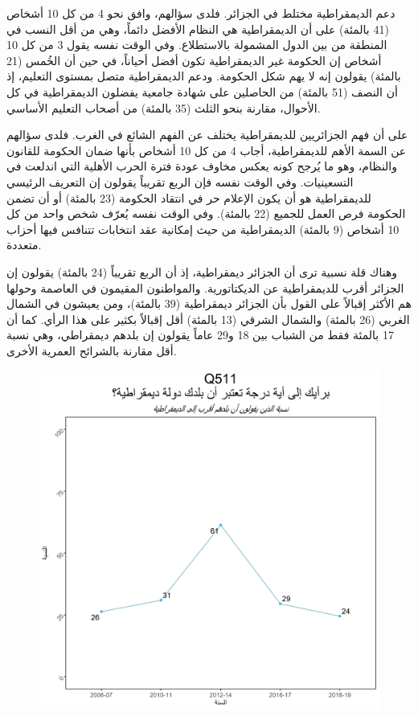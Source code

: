 \documentclass{article}
\begin{document}
 دعم الديمقراطية مختلط في الجزائر. فلدى سؤالهم، وافق نحو 4 من كل 10 أشخاص (41 بالمئة) على أن الديمقراطية هي النظام الأفضل دائماً، وهي من أقل النسب في المنطقة من بين الدول المشمولة بالاستطلاع. وفي الوقت نفسه يقول 3 من كل 10 أشخاص إن الحكومة غير الديمقراطية تكون أفضل أحياناً، في حين أن الخُمس (21 بالمئة) يقولون إنه لا يهم شكل الحكومة. ودعم الديمقراطية متصل بمستوى التعليم، إذ أن النصف (51 بالمئة) من الحاصلين على شهادة جامعية يفضلون الديمقراطية في كل الأحوال، مقارنة بنحو الثلث (35 بالمئة) من أصحاب التعليم الأساسي.
	
 على أن فهم الجزائريين للديمقراطية يختلف عن الفهم الشائع في الغرب. فلدى سؤالهم عن السمة الأهم للديمقراطية، أجاب 4 من كل 10 أشخاص بأنها ضمان الحكومة للقانون والنظام، وهو ما يُرجح كونه يعكس مخاوف عودة فترة الحرب الأهلية التي اندلعت في التسعينيات. وفي الوقت نفسه فإن الربع تقريباً يقولون إن التعريف الرئيسي للديمقراطية هو أن يكون الإعلام حر في انتقاد الحكومة (23 بالمئة) أو أن تضمن الحكومة فرص العمل للجميع (22 بالمئة). وفي الوقت نفسه يُعرّف شخص واحد من كل 10 أشخاص (9 بالمئة) الديمقراطية من حيث إمكانية عقد انتخابات تتنافس فيها أحزاب متعددة.
	
 وهناك قلة نسبية ترى أن الجزائر ديمقراطية، إذ أن الربع تقريباً (24 بالمئة) يقولون إن الجزائر أقرب للديمقراطية عن الديكتاتورية. والمواطنون المقيمون في العاصمة وحولها هم الأكثر إقبالاً على القول بأن الجزائر ديمقراطية (39 بالمئة)، ومن يعيشون في الشمال الغربي (26 بالمئة) والشمال الشرقي (13 بالمئة) أقل إقبالاً بكثير على هذا الرأي. كما أن 17 بالمئة فقط من الشباب بين 18 و29 عاماً يقولون إن بلدهم ديمقراطي، وهي نسبة أقل مقارنة بالشرائح العمرية الأخرى.
	
	\begin{center}
		\begin{figure}[H]
			\centering
			\includegraphics[width=13cm]{Q511_.png}
		\end{figure}
	\end{center}
	
\end{document}
